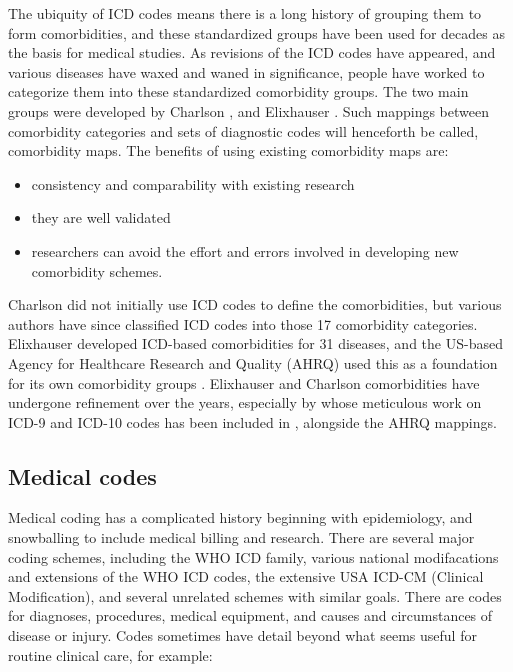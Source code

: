 \documentclass[article]{jss}
\providecommand{\tightlist}{%
  \setlength{\itemsep}{0pt}\setlength{\parskip}{0pt}}
\begin{document}
The ubiquity of ICD codes means there is a long history of grouping them
to form comorbidities, and these standardized groups have been used for
decades as the basis for medical studies. As revisions of the ICD codes
have appeared, and various diseases have waxed and waned in
significance, people have worked to categorize them into these
standardized comorbidity groups. The two main groups were developed by
Charlson \citep{charlson_new_1987}, and Elixhauser
\citep{elixhauser_comorbidity_1998}. Such mappings between comorbidity
categories and sets of diagnostic codes will henceforth be called,
comorbidity maps. The benefits of using existing comorbidity maps are:

\begin{itemize}
\tightlist
\item
  consistency and comparability with existing research
\item
  they are well validated
\item
  researchers can avoid the effort and errors involved in developing new
  comorbidity schemes.
\end{itemize}

Charlson did not initially use ICD codes to define the comorbidities,
but various authors \citep[e.g.,][]{quan_coding_2005} have since
classified ICD codes into those 17 comorbidity categories. Elixhauser
\citeyearpar{elixhauser_comorbidity_1998} developed ICD-based
comorbidities for 31 diseases, and the US-based Agency for Healthcare
Research and Quality (AHRQ) used this as a foundation for its own
comorbidity groups
\citep{AgencyforHealthcareResearchandQuality_ElixhauserComorbiditySoftware_2018}.
Elixhauser and Charlson comorbidities have undergone refinement over the
years, especially by \citet{quan_updating_2011} whose meticulous work on
ICD-9 and ICD-10 codes has been included in , alongside the
AHRQ mappings.

\subsection{Medical codes}\label{medical-codes}

Medical coding has a complicated history beginning with epidemiology,
and snowballing to include medical billing and research. There are
several major coding schemes, including the WHO ICD family, various
national modifacations and extensions of the WHO ICD codes, the
extensive USA ICD-CM (Clinical Modification), and several unrelated
schemes with similar goals. There are codes for diagnoses, procedures,
medical equipment, and causes and circumstances of disease or injury.
Codes sometimes have detail beyond what seems useful for routine
clinical care, for example:
\end{document}
